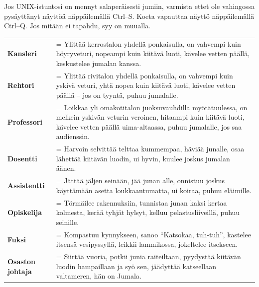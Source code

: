 \documentclass[a5paper, 8pt, twocolumn]{book} %
\numberwithin{equation}{section}
\begin{document}
Jos UNIX-istuntosi on mennyt salaperäisesti
jumiin, varmista ettet ole vahingossa
pysäyttänyt näyttöä näppäilemällä
Ctrl--S. Koeta vapauttaa näyttö näppäilemällä
Ctrl--Q. Jos mitään ei tapahdu, syy
on muualla.

\begin{table}[h!]
	\begin{tabularx}{\textwidth}{lX}
\textbf{Kansleri} &= Ylittää kerrostalon yhdellä ponkaisulla, on vahvempi kuin höyryveturi, nopeampi kuin kiitävä luoti, kävelee vetten päällä, keskustelee jumalan kanssa.\\
\textbf{Rehtori} &= Ylittää rivitalon yhdellä ponkaisulla, on vahvempi kuin yskivä veturi, yhtä nopea kuin kiitävä luoti, kävelee vetten päällä -- jos on tyyntä, puhuu jumalalle.\\
\textbf{Professori} &= Loikkaa yli omakotitalon juoksuvauhdilla myötätuulessa, on melkein yskivän veturin veroinen, hitaampi kuin kiitävä luoti, kävelee vetten päällä uima-altaassa, puhuu jumalalle, jos saa audienssin.\\
\textbf{Dosentti} &= Harvoin selvittää telttaa kummempaa, häviää junalle, osaa lähettää kiitävän luodin, ui hyvin, kuulee joskus jumalan äänen.\\
\textbf{Assistentti} &= Jättää jäljen seinään, jää junan alle, onnistuu joskus käyttämään asetta loukkaantumatta, ui koiraa, puhuu eläimille.\\
\textbf{Opiskelija} &= Törmäilee rakennuksiin, tunnistaa junan kaksi kertaa kolmesta, kerää tyhjät hylsyt, kelluu pelastusliiveillä, puhuu seinille.\\
\textbf{Fuksi} &= Kompastuu kynnykseen, sanoo ``Katsokaa, tuh-tuh'', kastelee itsensä vesipyssyllä, leikkii lammikossa, jokeltelee itsekseen. \\
\textbf{Osaston johtaja} &= Siirtää vuoria, potkii junia raiteiltaan, pyydystää kiitävän luodin hampaillaan ja syö sen, jäädyttää katseellaan valtameren, hän on Jumala.
	\end{tabularx}
\end{table}
\end{document}
